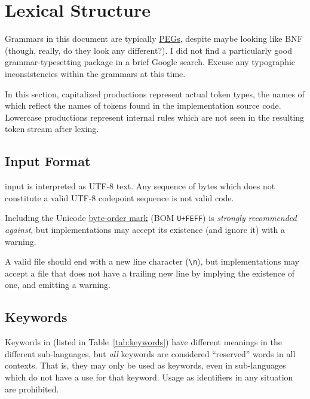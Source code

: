 \section{Lexical Structure}

Grammars in this document are typically
\href{https://en.wikipedia.org/wiki/Parsing_expression_grammar}{PEGs},
despite maybe looking like BNF (though, really, do they look any different?).
I did not find a particularly good grammar-typesetting package in a brief
Google search. Excuse any typographic inconsistencies within the grammars
at this time.

In this section, capitalized productions represent actual token types, the
names of which reflect the names of tokens found in the implementation source
code. Lowercase productions represent internal rules which are not seen in the
resulting token stream after lexing.

\subsection{Input Format}

\Trilogy{} input is interpreted as UTF-8 text. Any sequence of bytes which
does not constitute a valid UTF-8 codepoint sequence is not valid \Trilogy{}
code.

Including the Unicode \href{https://en.wikipedia.org/wiki/Byte_order_mark}{byte-order mark}
(BOM \texttt{U+FEFF}) is \emph{strongly recommended against}, but \Trilogy{}
implementations may accept its existence (and ignore it) with a warning.

A valid \Trilogy{} file should end with a new line character (\texttt{\textbackslash n}),
but \Trilogy{} implementations may accept a file that does not have
a trailing new line by implying the existence of one, and emitting a
warning.

\subsection{Keywords}
\FloatBarrier

Keywords in \Trilogy{} (listed in Table~\ref{tab:keywords}) have
different meanings in the different sub-languages, but \emph{all}
keywords are considered ``reserved'' words in all contexts. That
is, they may only be used as keywords, even in sub-languages which
do not have a use for that keyword. Usage as identifiers in any
situation are prohibited.

